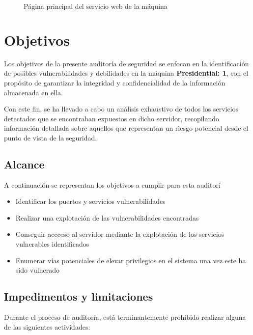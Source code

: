 \documentclass[a4paper]{article} %
\newcommand{\machineName}{Presidential: 1}
\begin{document}
  \begin{figure}[h]
    \centering
    \setlength{\fboxrule}{0.9pt}
    \caption{Página principal del servicio web de la máquina}
  \end{figure}

  \section{Objetivos}
  
  Los objetivos de la presente auditoría de seguridad se enfocan en la identificación de posibles vulnerabilidades y debilidades en 
  la máquina \textbf{\color{bluePortada}\machineName}, con el propósito de garantizar la integridad y confidencialidad de la información
  almacenada en ella.

  Con este fin, se ha llevado a cabo un análisis exhaustivo de todos los servicios detectados que se encontraban expuestos en dicho servidor,
  recopilando información detallada sobre aquellos que representan un riesgo potencial desde el punto de vista de la seguridad.

  \clearpage
  \subsection{Alcance}
  
  A continuación se representan los objetivos a cumplir para esta auditorí

  \begin{itemize}
    \item Identificar los puertos y servicios vulnerabilidades
    \item Realizar una explotación de las vulnerabilidades encontradas
    \item Conseguir accceso al servidor mediante la explotación de los servicios vulnerables identificados
    \item Enumerar vías potenciales de elevar privilegios en el sistema una vez este ha sido vulnerado
  \end{itemize}

  \subsection{Impedimentos y limitaciones}

      Durante el proceso de auditoría, está terminantemente prohibido realizar alguna de las siguientes actividades:
      
\end{document}
